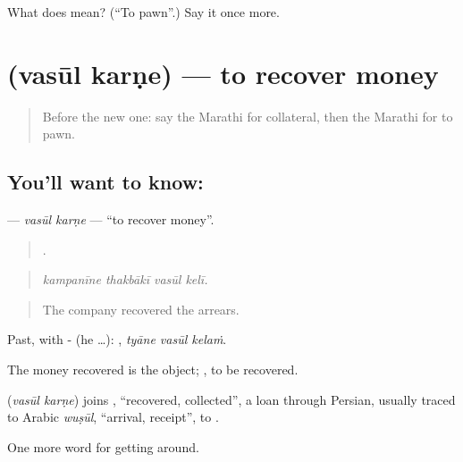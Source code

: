 \begin{tcolorbox}[breakable,colback=teal!4,colframe=teal!35!black,title={Before you move on}]
What does   mean? (\textquotedblleft{}To pawn\textquotedblright{}.) Say it once more.
\end{tcolorbox}
\section[\texorpdfstring{\mr{वसूल} \mr{करणे} (vasūl karṇe)}{वसूल करणे (vasūl karṇe)}]{  (vasūl karṇe) — to recover money}

\label{lesson:MR-C429-vasul-karne}



\begin{quote}
Before the new one: say the Marathi for collateral, then the Marathi for to pawn.
\end{quote}

\subsection*{You'll want to know:  }
\textbf{ } — \emph{vasūl karṇe} — \textquotedblleft{}to recover money\textquotedblright{}.

\begin{quote}
   .
\end{quote}

\begin{quote}
\emph{kampanīne thakbākī vasūl kelī.}
\end{quote}

\begin{quote}
The company recovered the arrears.
\end{quote}

Past, with - (he …):   , \emph{tyāne vasūl kelaṁ}.

The money recovered is the object;  , to be recovered.

\begin{cousinweb}
\textbf{ } (\emph{vasūl karṇe}) joins \textbf{}, \textquotedblleft{}recovered, collected\textquotedblright{}, a loan through Persian, usually traced to Arabic \emph{wuṣūl}, \textquotedblleft{}arrival, receipt\textquotedblright{}, to \textbf{}.
\end{cousinweb}

\begin{grammarlens}[title={What you've built}]
One more word for getting around.
\end{grammarlens}

